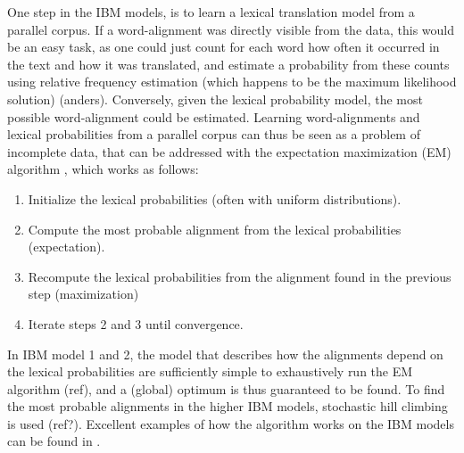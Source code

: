 \documentclass{report}
\theoremstyle{definition}
\theoremstyle{plain}
\begin{document}
One step in the IBM models, is to learn a lexical translation model from a parallel corpus. If a word-alignment was directly visible from the data, this would be an easy task, as one could just count for each word how often it occurred in the text and how it was translated, and estimate a probability from these counts using relative frequency estimation (which happens to be the maximum likelihood solution) (anders). Conversely, given the lexical probability model, the most possible word-alignment could be estimated. Learning word-alignments and lexical probabilities from a parallel corpus can thus be seen as a problem of incomplete data, that can be addressed with the expectation maximization (EM) algorithm \citep{dempster1977maximum}, which works as follows:\begin{enumerate}
\item Initialize the lexical probabilities (often with uniform distributions).
\item Compute the most probable alignment from the lexical probabilities (expectation).
\item Recompute the lexical probabilities from the alignment found in the previous step (maximization)
\item Iterate steps 2 and 3 until convergence.
\end{enumerate}

In IBM model 1 and 2, the model that describes how the alignments depend on the lexical probabilities are sufficiently simple to exhaustively run the EM algorithm (ref), and a (global) optimum is thus guaranteed to be found. To find the most probable alignments in the higher IBM models, stochastic hill climbing is used (ref?). Excellent examples of how the algorithm works on the IBM models can be found in \cite[p88-113]{koehn2008statistical}.
\end{document}
